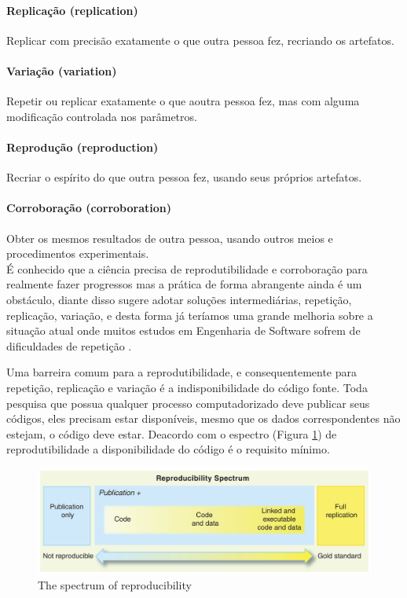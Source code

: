 \documentclass[12pt]{article}
\begin{document}
\paragraph{Replicação (replication)}
Replicar com precisão exatamente o que outra pessoa fez, recriando os
artefatos.

\paragraph{Variação (variation)}
Repetir ou replicar exatamente o que aoutra pessoa fez, mas com alguma
modificação controlada nos parâmetros.

\paragraph{Reprodução (reproduction)}
Recriar o espírito do que outra pessoa fez, usando seus próprios artefatos.

\paragraph{Corroboração (corroboration)}
Obter os mesmos resultados de outra pessoa, usando outros meios e
procedimentos experimentais. \\

É conhecido que a ciência precisa de reprodutibilidade e corroboração para
realmente fazer progressos mas a prática de forma abrangente ainda é um
obstáculo, diante disso  sugere adotar soluções
intermediárias, repetição, replicação, variação, e desta forma já teríamos uma
grande melhoria sobre a situação atual onde muitos estudos em Engenharia de
Software sofrem de dificuldades de repetição \cite{Tang2016}.

Uma barreira comum para a reprodutibilidade, e consequentemente para
repetição, replicação e variação é a indisponibilidade do código fonte.  Toda
pesquisa que possua qualquer processo computadorizado deve publicar seus
códigos, eles precisam estar disponíveis, mesmo que os dados correspondentes
não estejam, o código deve estar. Deacordo com o espectro (Figura
\ref{reproducibility-spectrum}) de reprodutibilidade a disponibilidade do
código é o requisito mínimo.

\begin{figure}[h]
  \center
  \includegraphics[scale=0.25]{imagens/reproducibility-spectrum.png}
  \caption{The spectrum of reproducibility\cite{Peng2011}}
  \label{reproducibility-spectrum}
\end{figure}
\end{document}
